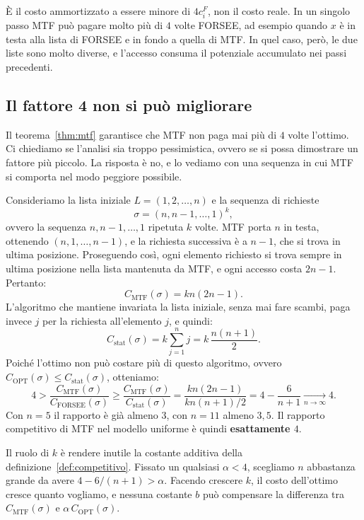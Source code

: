 \begin{osservazione}
È il costo ammortizzato a essere minore di $4c^F_i$, non il costo reale. In un singolo passo MTF può pagare molto più di $4$ volte FORSEE, ad esempio quando $x$ è in testa alla lista di FORSEE e in fondo a quella di MTF. In quel caso, però, le due liste sono molto diverse, e l'accesso consuma il potenziale accumulato nei passi precedenti.
\end{osservazione}

\subsection{Il fattore 4 non si può migliorare}\label{sec:mtf-ottimalita}
Il teorema~\ref{thm:mtf} garantisce che MTF non paga mai più di $4$ volte l'ottimo. Ci chiediamo se l'analisi sia troppo pessimistica, ovvero se si possa dimostrare un fattore più piccolo. La risposta è no, e lo vediamo con una sequenza in cui MTF si comporta nel modo peggiore possibile.

Consideriamo la lista iniziale $L = (1, 2, \dots, n)$ e la sequenza di richieste
\[
\sigma = (n, n-1, \dots, 1)^k,
\]
ovvero la sequenza $n, n-1, \dots, 1$ ripetuta $k$ volte. MTF porta $n$ in testa, ottenendo $(n, 1, \dots, n-1)$, e la richiesta successiva è a $n-1$, che si trova in ultima posizione. Proseguendo così, ogni elemento richiesto si trova sempre in ultima posizione nella lista mantenuta da MTF, e ogni accesso costa $2n - 1$. Pertanto:
\[
C_{\mathrm{MTF}}(\sigma) = kn(2n - 1).
\]
L'algoritmo che mantiene invariata la lista iniziale, senza mai fare scambi, paga invece $j$ per la richiesta all'elemento $j$, e quindi:
\[
C_{\mathrm{stat}}(\sigma) = k \sum_{j=1}^{n} j = k\, \frac{n(n+1)}{2}.
\]
Poiché l'ottimo non può costare più di questo algoritmo, ovvero $C_{\mathrm{OPT}}(\sigma) \le C_{\mathrm{stat}}(\sigma)$, otteniamo:
\[
4 > \frac{C_{\mathrm{MTF}}(\sigma)}{C_{\mathrm{FORSEE}}(\sigma)} \ge \frac{C_{\mathrm{MTF}}(\sigma)}{C_{\mathrm{stat}}(\sigma)} = \frac{kn(2n-1)}{kn(n+1)/2} = 4 - \frac{6}{n+1} \xrightarrow[n \to \infty]{} 4.
\]
Con $n = 5$ il rapporto è già almeno $3$, con $n = 11$ almeno $3{,}5$. Il rapporto competitivo di MTF nel modello uniforme è quindi \textbf{esattamente $4$}.

Il ruolo di $k$ è rendere inutile la costante additiva della definizione~\ref{def:competitivo}. Fissato un qualsiasi $\alpha < 4$, scegliamo $n$ abbastanza grande da avere $4 - 6/(n+1) > \alpha$. Facendo crescere $k$, il costo dell'ottimo cresce quanto vogliamo, e nessuna costante $b$ può compensare la differenza tra $C_{\mathrm{MTF}}(\sigma)$ e $\alpha\, C_{\mathrm{OPT}}(\sigma)$.

